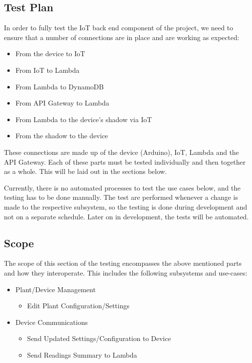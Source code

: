 \documentclass{article}
\begin{document}
	\subsection{Test Plan}
		In order to fully test the IoT back end component of the project, we need to ensure that a number of connections are in place and are working as expected:
		\begin{itemize}
			\item{From the device to IoT}
			\item{From IoT to Lambda}
			\item{From Lambda to DynamoDB}
			\\
			\item{From API Gateway to Lambda}
			\item{From Lambda to the device's shadow via IoT}
			\item{From the shadow to the device}
		\end{itemize}
		
		These connections are made up of the device (Arduino), IoT, Lambda and the API Gateway. Each of these parts must be tested individually and then together as a whole. This will be laid out in the sections below.
		
		Currently, there is no automated processes to test the use cases below, and the testing has to be done manually. The test are performed whenever a change is made to the respective subsystem, so the testing is done during development and not on a separate schedule. Later on in development, the tests will be automated.
	\subsection{Scope}
		 The scope of this section of the testing encompasses the above mentioned parts and how they interoperate. This includes the following subsystems and use-cases:
		 \begin{itemize}
		 	\item Plant/Device Management
				\begin{itemize}
					\item Edit Plant Configuration/Settings
				\end{itemize}
		 	\item Device Communications
			 	\begin{itemize}
			 		\item Send Updated Settings/Configuration to Device
			 		\item Send Readings Summary to Lambda
			 	\end{itemize}
		 \end{itemize}
		 
\end{document}
